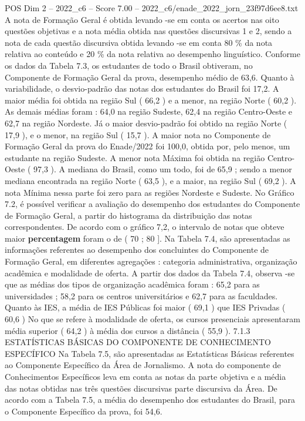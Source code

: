 \begin{textsample}{POS Dim 2 – 2022\_c6 – Score 7.00 – 2022\_c6/enade\_2022\_jorn\_23f97d6ee8.txt}
A nota de Formação Geral é obtida levando -se em conta os acertos nas oito questões objetivas e a nota média obtida nas questões discursivas 1 e 2, sendo a nota de cada questão discursiva obtida levando -se em conta 80 \% da nota relativa ao conteúdo e 20 \% da nota relativa ao desempenho linguístico.
Conforme os dados da Tabela 7.3, os estudantes de todo o Brasil obtiveram, no Componente de Formação Geral da prova, desempenho médio de 63,6.
Quanto à variabilidade, o desvio-padrão das notas dos estudantes do Brasil foi 17,2.
A maior média foi obtida na região Sul ( 66,2 ) e a menor, na região Norte ( 60,2 ).
As demais médias foram : 64,0 na região Sudeste, 62,4 na região Centro-Oeste e 62,7 na região Nordeste.
Já o maior desvio-padrão foi obtido na região Norte ( 17,9 ), e o menor, na região Sul ( 15,7 ).
A maior nota no Componente de Formação Geral da prova do Enade/2022 foi 100,0, obtida por, pelo menos, um estudante na região Sudeste.
A menor nota Máxima foi obtida na região Centro-Oeste ( 97,3 ).
A mediana do Brasil, como um todo, foi de 65,9 ; sendo a menor mediana encontrada na região Norte ( 63,5 ), e a maior, na região Sul ( 69,2 ).
A nota Mínima nessa parte foi zero para as regiões Nordeste e Sudeste.
No Gráfico 7.2, é possível verificar a avaliação do desempenho dos estudantes do Componente de Formação Geral, a partir do histograma da distribuição das notas correspondentes.
De acordo com o gráfico 7,2, o intervalo de notas que obteve maior \textbf{percentagem} foram o de ( 70 ; 80 ].
Na Tabela 7.4, são apresentadas as informações referentes ao desempenho dos concluintes do Componente de Formação Geral, em diferentes agregações : categoria administrativa, organização acadêmica e modalidade de oferta.
A partir dos dados da Tabela 7.4, observa -se que as médias dos tipos de organização acadêmica foram : 65,2 para as universidades ; 58,2 para os centros universitários e 62,7 para as faculdades.
Quanto às IES, a média de IES Públicas foi maior ( 69,1 ) que IES Privadas ( 60,6 ) No que se refere à modalidade de oferta, os cursos presenciais apresentaram média superior ( 64,2 ) à média dos cursos a distância ( 55,9 ). 7.1.3 ESTATÍSTICAS BÁSICAS DO COMPONENTE DE CONHECIMENTO ESPECÍFICO Na Tabela 7.5, são apresentadas as Estatísticas Básicas referentes ao Componente Específico da Área de Jornalismo.
A nota do componente de Conhecimentos Específicos leva em conta as notas da parte objetiva e a média das notas obtidas nas três questões discursivas parte discursiva da Área.
De acordo com a Tabela 7.5, a média do desempenho dos estudantes do Brasil, para o Componente Específico da prova, foi 54,6.

\end{textsample}
